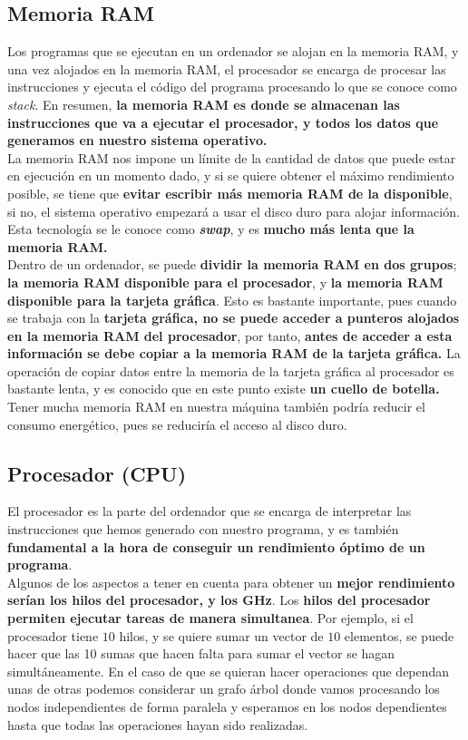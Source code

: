 \subsection{Memoria RAM}
Los programas que se ejecutan en un ordenador se alojan en la memoria RAM, y una vez alojados en la memoria RAM, el procesador se encarga de procesar las instrucciones y ejecuta el código del programa procesando lo que se conoce como \textit{stack}. En resumen, \textbf{la memoria RAM es donde se almacenan las instrucciones que va a ejecutar el procesador, y todos los datos que generamos en nuestro sistema operativo.}
\\ 
La memoria RAM nos impone un límite de la cantidad de datos que puede estar en ejecución en un momento dado, y si se quiere obtener el máximo rendimiento posible, se tiene que \textbf{evitar escribir más memoria RAM de la disponible}, si no, el sistema operativo empezará a usar el disco duro para alojar información. Esta tecnología se le conoce como \textbf{\textit{swap}}, y es \textbf{mucho más lenta que la memoria RAM.}
\\ 
Dentro de un ordenador, se puede \textbf{dividir la memoria RAM en dos grupos}; \textbf{la memoria RAM disponible para el procesador}, y  \textbf{la memoria RAM disponible para la tarjeta gráfica}. Esto es bastante importante, pues cuando se trabaja con la \textbf{tarjeta gráfica, no se puede acceder a punteros alojados en la memoria RAM del procesador}, por tanto, \textbf{antes de acceder a esta información se debe copiar a la memoria RAM de la tarjeta gráfica.} La operación de copiar datos entre la memoria de la tarjeta gráfica al procesador es bastante lenta, y es conocido que en este punto existe \textbf{un cuello de botella.}
\\ 
Tener mucha memoria RAM en nuestra máquina también podría reducir el consumo energético, pues se reduciría el acceso al disco duro.

\subsection{Procesador (CPU)}
El procesador es la parte del ordenador que se encarga de interpretar las instrucciones que hemos generado con nuestro programa, y es también \textbf{fundamental a la hora de conseguir un rendimiento óptimo de un programa}. \\
Algunos de los aspectos a tener en cuenta para obtener un \textbf{mejor rendimiento serían los hilos del procesador, y los GHz}. Los \textbf{hilos del procesador permiten ejecutar tareas de manera simultanea}. Por ejemplo, si el procesador tiene $10$ hilos, y se quiere sumar un vector de $10$ elementos, se puede hacer que las 10 sumas que hacen falta para sumar el vector se hagan simultáneamente. En el caso de que se quieran hacer operaciones que dependan unas de otras podemos considerar un grafo árbol donde vamos procesando los nodos independientes de forma paralela y esperamos en los nodos dependientes hasta que todas las operaciones hayan sido realizadas.
